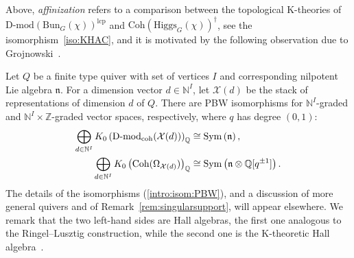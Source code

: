 \documentclass [11pt,oneside,a4paper,mathscr]{amsart}
\theoremstyle{definition}
\newcommand{\X}{\mathcal{X}}
\newcommand{\Coh}{\operatorname{Coh}}
\newcommand{\Hig}{\mathrm{Higgs}}
\newcommand{\Bun}{\mathrm{Bun}}
\begin{document}
  

 Above, \textit{affinization} refers to a comparison between the topological K-theories of $\text{D-mod}(\Bun_G(\chi))^{\text{lcp}}$ and $\mathrm{Coh}(\Hig_G(\chi))^\dagger$, see the isomorphism~\eqref{iso:KHAC}, and it is motivated by the following observation due to Grojnowski~\cite{GrojnowskiU}. 
  
 
 
Let $Q$ be a finite type quiver with set of vertices $I$ and corresponding nilpotent Lie algebra $\mathfrak{n}$. For a dimension vector $d\in\mathbb{N}^I$, let $\X(d)$ be the stack of representations of dimension $d$ of $Q$. There are PBW isomorphisms for $\mathbb{N}^I$-graded and $\mathbb{N}^I\times\mathbb{Z}$-graded vector spaces, respectively, where $q$ has degree $(0,1)$:
\begin{align}\label{intro:isom:PBW}
\bigoplus_{d\in\mathbb{N}^I}K_0\left(\text{D-mod}_{\mathrm{coh}}(\X(d))\right)_\mathbb{Q}&\cong \mathrm{Sym}\left(\mathfrak{n}\right),\\
\notag
\bigoplus_{d\in\mathbb{N}^I}K_0\left(\mathrm{Coh}(\Omega_{\X(d)})\right)_\mathbb{Q}&\cong \operatorname{Sym}\left(\mathfrak{n}\otimes \mathbb{Q}[q^{\pm 1}]\right).
\end{align}
The details of the isomorphisms (\ref{intro:isom:PBW}), and a discussion of more general quivers and of Remark~\ref{rem:singularsupport}, will appear elsewhere. We remark that the two left-hand sides are Hall algebras, the first one analogous to the Ringel--Lusztig construction, while the second one is the K-theoretic Hall algebra~\cite{VaVa}. 

\medskip
\end{document}
